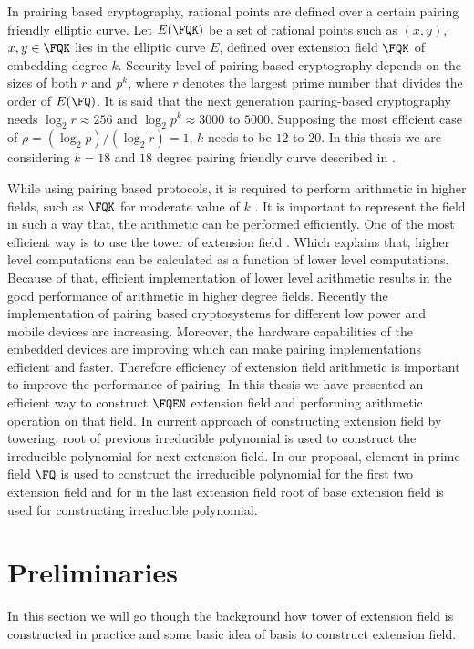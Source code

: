 In prairing based cryptography, rational points are defined over a certain pairing friendly elliptic curve. Let $E(\FQK)$ be a set of rational points such as $(x, y)$,  $x, y \in \FQK$ lies in the elliptic curve $E$, defined over extension field $\FQK$ of embedding degree $k$. Security level of pairing based cryptography depends on the sizes of both $r$ and $p^k$, where $r$ denotes the largest prime number that divides the order of $E(\FQ)$. It is said that the next generation pairing-based cryptography needs $\log_2 r \approx 256$ and $\log_2 p^k \approx 3000$ to $5000$. Supposing the most efficient case of $\rho = (\log_2 p)/(\log_2 r) = 1$, $k$ needs to be $12$ to $20$.  In this thesis we are considering $k=18$ and $18$ degree pairing friendly curve described in \cite{EPRINT:FreScoTes06}. 

While using pairing based protocols, it is required to perform arithmetic in higher fields, such as $\FQK$  for moderate value of $k$ \cite{Silverman}. It is important to represent the field in such a way that, the arithmetic can be performed efficiently.  One of the most efficient way is to use the tower of extension field \cite{EPRINT:BenSco09}. Which explains that, higher level computations can be calculated as a function of lower level computations. Because of that, efficient implementation of lower level arithmetic results in the good performance of arithmetic in higher degree fields. Recently the implementation of pairing based cryptosystems for different low power and mobile devices are increasing. Moreover, the hardware capabilities of the embedded devices are improving which can make pairing implementations efficient and faster. Therefore efficiency of extension field arithmetic is important to improve the performance of pairing. In this thesis we have presented an efficient way to construct $\FQEN$  extension field and performing arithmetic operation on that field. In current approach of constructing extension field by towering, root of previous irreducible polynomial is used to construct the irreducible polynomial for next extension field. In our proposal, element in prime field $\FQ$ is used to construct the irreducible polynomial for the first two extension field and for in the last extension field root of base extension field is used for constructing irreducible polynomial.


\section{Preliminaries}
In this section we will go though the background how tower of extension field is constructed in practice and some basic idea of basis to construct extension field. 

